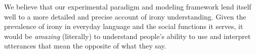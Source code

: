 \documentclass[10pt,letterpaper]{article}
\begin{document}
We believe that our experimental paradigm and modeling framework lend itself well to a more detailed and precise account of irony understanding. Given the prevalence of irony in everyday language and the social functions it serves, it would be \emph{amazing} (literally) to understand people's ability to use and interpret utterances that mean the opposite of what they say. 

%
%







%
\end{document}
